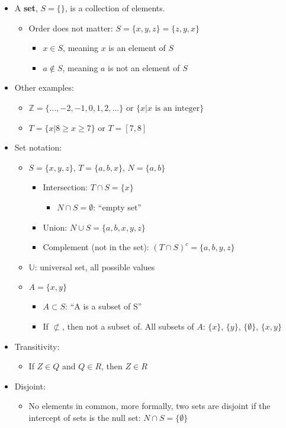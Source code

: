 \begin{itemize}
    \itemsep-0.5em 
    \item A \textbf{set}, $S = \{\}$, is a collection of elements.
    \begin{itemize}
        \item Order does not matter: $S = \{x,y,z\} = \{z,y,x\}$
        \begin{itemize}
            \item $x \in S$, meaning $x$ is an element of $S$
            \item $a \notin S$, meaning $a$ is not an element of $S$
        \end{itemize}
    \end{itemize}
    \item Other examples:
    \begin{itemize}
        \item $\mathbb{Z} = \{..., -2, -1, 0, 1, 2, ...\}$ or $\{x|x\text{ is an integer}\}$
        \item $T = \{x|8 \geq x \geq 7 \}$ or $T = [7,8]$
    \end{itemize}
    \item Set notation:
    \begin{itemize}
        \item $S = \{x,y,z\}$, $T = \{a,b,x\}$, $N = \{a,b\}$
        \begin{itemize}
            \item Intersection: $T \cap S = \{x\}$
            \begin{itemize}
                \item $N \cap S = \emptyset$: ``empty set''
            \end{itemize}
            \item Union: $N \cup S = \{a,b,x,y,z\}$
            \item Complement (not in the set): $(T \cap S)^c = \{a,b,y,z\}$
        \end{itemize}
        \item $\mathbb{U}$: universal set, all possible values
        \item $A = \{x,y\}$
        \begin{itemize}
            \item $A \subset S$: ``A is a subset of S''
            \item If $\not\subset$, then not a subset of. All subsets of $A$: $\{x\}$, $\{y\}$, $\{\emptyset\}$, $\{x,y\}$
        \end{itemize}
    \end{itemize}
    \item Transitivity:
    \begin{itemize}
        \item If $Z \in Q$ and $Q \in R$, then $Z \in R$
    \end{itemize}
    \item Disjoint:
    \begin{itemize}
        \item No elements in common, more formally, two sets are disjoint if the intercept of sets is the null set: $N \cap S = \{ \emptyset \}$
    \end{itemize}  
\end{itemize}

